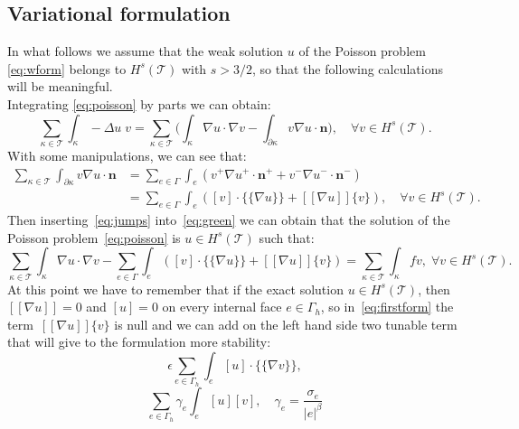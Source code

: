 \documentclass[12pt, a4paper]{article}
\theoremstyle{definition}
\theoremstyle{plain}
\theoremstyle{plain}
\begin{document}
\subsection{Variational formulation}
In what follows we assume that the weak solution $u$ of the Poisson problem~ \eqref{eq:wform} belongs to $H^s(\mathcal{T})$ with $s > 3/2$, so that the following calculations will be meaningful.\\
Integrating \eqref{eq:poisson} by parts we can obtain:
\begin{equation} \label{eq:green}
	\sum_{\kappa \in \mathcal{T}} \int_\kappa -\Delta u \; v
	= \sum_{\kappa \in \mathcal{T}} \bigg( \int_\kappa \nabla u \cdot \nabla v
	- \int_{\partial \kappa} v \nabla u \cdot \mathbf{n} \bigg), \quad \forall v \in H^s(\mathcal{T}).
\end{equation}
With some manipulations, we can see that:
\begin{equation} \label{eq:jumps}
\begin{split}
	\sum_{\kappa \in \mathcal{T}} \int_{\partial \kappa} v \nabla u \cdot \mathbf{n} &= \sum_{e \in \Gamma} \int_e (v^+ \nabla u^+ \cdot \mathbf{n}^+ + v^- \nabla u^- \cdot \mathbf{n}^- )\\
	&= \sum_{e \in \Gamma} \int_e ([v] \cdot \{\!\!\{ \nabla u \}\!\!\} + [\![ \nabla u ]\!] \{v\} ), \quad \forall v \in H^s(\mathcal{T}).
\end{split}
\end{equation}
Then inserting~\eqref{eq:jumps} into~\eqref{eq:green} we can obtain that the solution of the Poisson problem~\eqref{eq:poisson} is $u \in H^s(\mathcal{T})$ such that:
\begin{equation} \label{eq:firstform}
	\sum_{\kappa \in \mathcal{T}} \int_\kappa \nabla u \cdot \nabla v -
	\sum_{e \in \Gamma} \int_e ([v] \cdot \{\!\!\{ \nabla u \}\!\!\} + [\![ \nabla u ]\!] \{v\} ) =
	\sum_{\kappa \in \mathcal{T}} \int_\kappa fv, \; \forall v \in H^s(\mathcal{T}).
\end{equation}
At this point we have to remember that if the exact solution $u \in H^s(\mathcal{T})$, then $[\![\nabla u]\!] = 0$ and $[u] = 0$ on every internal face $e \in \Gamma_h$, so in~\eqref{eq:firstform} the term~$[\![ \nabla u ]\!] \{v\}$ is null and we can add on the left hand side two tunable term that will give to the formulation more stability:
\begin{equation*}
	\epsilon \sum_{e \in \Gamma_h} \int_e [u] \cdot \{\!\!\{ \nabla v \}\!\!\},
\end{equation*}
\begin{equation*}
	\sum_{e \in \Gamma_h} \gamma_e \int_e [u][v], \quad \gamma_e = \frac{\sigma_e}{|e|^\beta}
\end{equation*}
\end{document}

